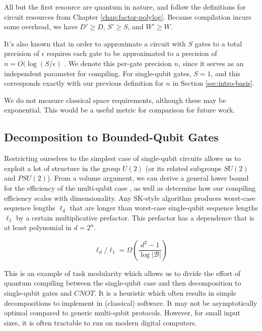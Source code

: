 All but the first resource are quantum in nature, and follow the definitions
for circuit resources from Chapter \ref{chap:factor-polylog}. Because
compilation incurs some overhead, we have $D' \ge D$, $S' \ge S$, and
$W' \ge W$.

It's also known that
in order to approximate a circuit with $S$ gates to a total precision of
$\epsilon$
requires each gate to be approximated to a precision of
$n = O(\log(S/\epsilon)$ \cite{Lloyd1995}. We denote this per-gate precision
$n$, since it serves as an independent parameter for compiling. For
single-qubit gates, $S = 1$, and this corresponds exactly with our previous
definition for $n$ in Section \ref{sec:intro-basis}.

We do not measure classical space requirements, although these may be
exponential. This would be a useful metric for comparison for future work.

\subsection{Decomposition to Bounded-Qubit Gates}
\label{subsec:qcompile-multi}

Restricting ourselves to the simplest case of
single-qubit circuits allows us to exploit a lot of structure
in the group $U(2)$ (or its related subgroups $SU(2)$ and $PSU(2)$).
From a volume argument, we can derive a general
lower bound for the efficiency of the multi-qubit case \cite{Harrow2002},
as well as determine how our compiling efficiency scales with dimensionality.
Any
SK-style algorithm produces worst-case sequence lengths $\ell_d$ that
are longer than worst-case single-qubit sequence lengths $\ell_1$ by a certain multiplicative
prefactor. This prefactor has a dependence that is at least
polynomial in $d = 2^n$. 

\begin{equation}
\ell_d / \ell_1 = \Omega \left( \frac{d^2 - 1}{ \log |\mathcal{B}| } \right )
\end{equation}

This is an example of task modularity which allows us
to divide the effort of quantum compiling between the
single-qubit case and then decomposition to single-qubit gates and
$CNOT$. It is a heuristic which often results
in simple decompositions to implement in (classical) software.
It may not be asymptotically optimal compared to generic 
multi-qubit protocols. However, for small input sizes, it is often
tractable to run on modern digital computers.

